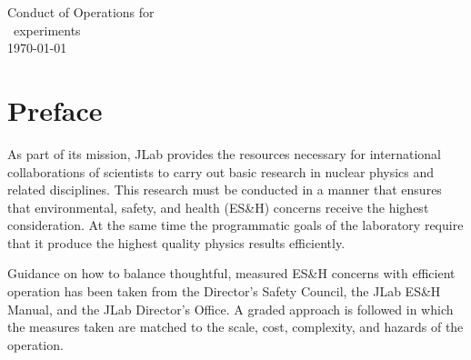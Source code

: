 \documentclass[11pt]{article}
\begin{document}
% 
%                       
%
%
%
%
%
%
%


\begin{center}
\Large 
Conduct of Operations for \HALL\ \\
\EXPTS \ experiments \\ 
\today 
  
\end{center}
\normalsize

\tableofcontents


\newpage

\section{Preface}
\indent

As part of its mission, JLab provides the resources necessary for international
collaborations of scientists to carry out basic research in nuclear physics 
and related disciplines. This research must be conducted
in a manner that ensures that environmental, safety, and health (ES\&H) 
concerns receive the highest consideration. At the same time the programmatic 
goals of the laboratory require that it produce the highest quality physics 
results efficiently.

Guidance on how to balance thoughtful, measured ES\&H concerns with efficient
operation has been taken from 
the Director's Safety Council, the JLab ES\&H Manual, and the
JLab Director's Office. A graded approach is followed in which the measures 
taken are matched to the scale, cost, complexity, and hazards of the operation.
\end{document}
